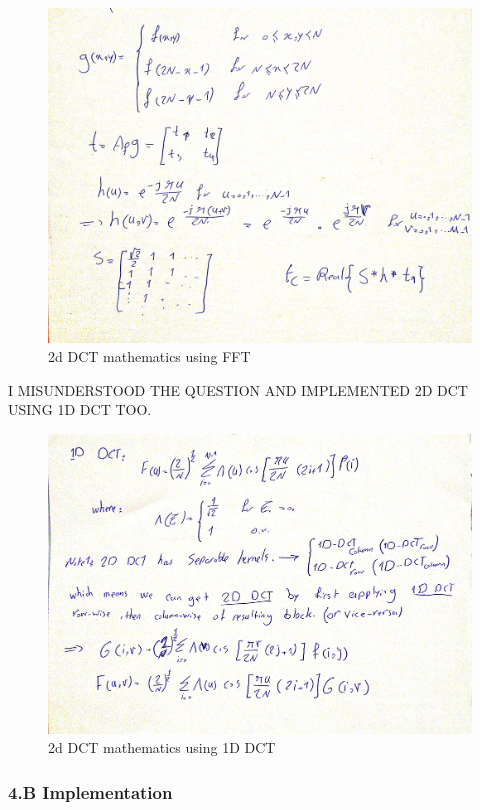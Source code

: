 \documentclass[11pt]{article}
\makeatletter
\def\maxwidth{\ifdim\Gin@nat@width>\linewidth\linewidth
    \else\Gin@nat@width\fi}
\let\Oldincludegraphics\includegraphics
\renewcommand{\includegraphics}[1]{\Oldincludegraphics[width=.8\maxwidth]{#1}}
\makeatother
\begin{document}
    \begin{figure}
\centering
\includegraphics{wiki/dct_fft.jpg}
\caption{2d DCT mathematics using FFT}
\end{figure}

    I MISUNDERSTOOD THE QUESTION AND IMPLEMENTED 2D DCT USING 1D DCT TOO.

\begin{figure}
\centering
\includegraphics{wiki/4.1.jpg}
\caption{2d DCT mathematics using 1D DCT}
\end{figure}

    \hypertarget{b-implementation}{%
\subsubsection{4.B Implementation}\label{b-implementation}}
\end{document}

